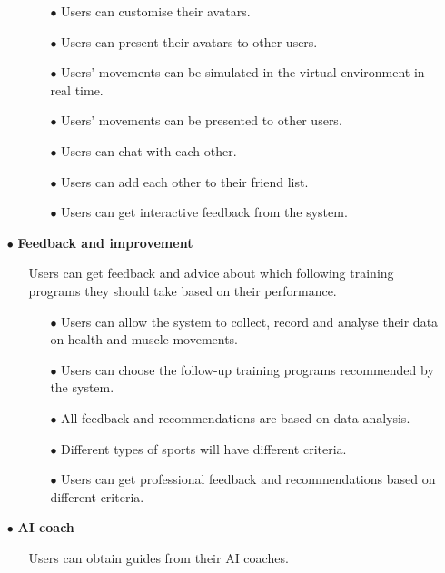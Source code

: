 \documentclass[a4paper]{article}
\begin{document}
\begin{itemize}
\begin{itemize}
			\begin{itemize}
				\item[$\bullet$] Users can customise their avatars.
				\item[$\bullet$] Users can present their avatars to other users.
				\item[$\bullet$] Users' movements can be simulated in the virtual environment in real time.
				\item[$\bullet$] Users' movements can be presented to other users.
				\item[$\bullet$] Users can chat with each other.
				\item[$\bullet$] Users can add each other to their friend list.
				\item[$\bullet$] Users can get interactive feedback from the system.								
			\end{itemize}
		\end{itemize}
		\item[$\bullet$] {\large\textbf{Feedback and improvement}}
		\begin{itemize}
			\item[] Users can get feedback and advice about which following training programs they should take based on their performance.
			\begin{itemize}
				\item[$\bullet$] Users can allow the system to collect, record and analyse their data on health and muscle movements.  
				\item[$\bullet$]Users can choose the follow-up training programs recommended by the system.  
				\item[$\bullet$]All feedback and recommendations are based on data analysis.
				\item[$\bullet$]Different types of sports will have different criteria.  
				\item[$\bullet$]Users can get professional feedback and recommendations based on different criteria.				
			\end{itemize}
		\end{itemize}
		\item[$\bullet$] {\large\textbf{AI coach}}
		\begin{itemize}
			\item[] Users can obtain guides from their AI coaches.
			\begin{itemize}

\end{itemize}
\end{itemize}
\end{itemize}
\end{document}
